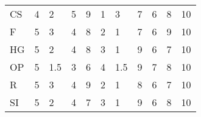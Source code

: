 \documentclass[11pt, a4paper]{article}
\begin{document}
\begin{table}[H]
\begin{tabular}{lllllllllll}
CS                           & 4                                        & 2                                & 5                                & 9                                  & 1                                 & 3                               & 7                                 & 6                                   & 8                                   & 10                                  \\
F                             & 5                                        & 3                                & 4                                & 8                                  & 2                                 & 1                               & 7                                 & 6                                   & 9                                   & 10                                  \\
HG                          & 5                                        & 2                                & 4                                & 8                                  & 3                                 & 1                               & 9                                 & 6                                   & 7                                   & 10                                  \\
OP                       & 5                                        & 1.5                              & 3                                & 6                                  & 4                                 & 1.5                             & 9                                 & 7                                   & 8                                   & 10                                  \\
R                                & 5                                        & 3                                & 4                                & 9                                  & 2                                 & 1                               & 8                                 & 6                                   & 7                                   & 10                                  \\
SI                        & 5                                        & 2                                & 4                                & 7                                  & 3                                 & 1                               & 9                                 & 6                                   & 8                                   & 10                                  \\

\end{tabular}
\end{table}
\end{document}
